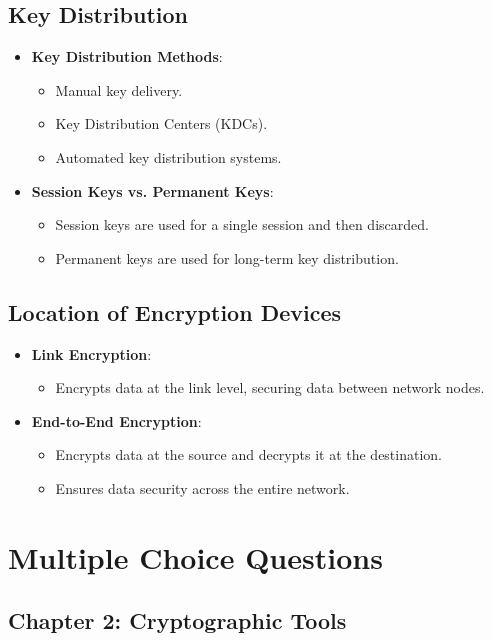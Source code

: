\documentclass[12pt]{article}
\begin{document}
\subsection{Key Distribution}
\begin{itemize}
    \item \textbf{Key Distribution Methods}:
    \begin{itemize}
        \item Manual key delivery.
        \item Key Distribution Centers (KDCs).
        \item Automated key distribution systems.
    \end{itemize}
    \item \textbf{Session Keys vs. Permanent Keys}:
    \begin{itemize}
        \item Session keys are used for a single session and then discarded.
        \item Permanent keys are used for long-term key distribution.
    \end{itemize}
\end{itemize}

\subsection{Location of Encryption Devices}
\begin{itemize}
    \item \textbf{Link Encryption}:
    \begin{itemize}
        \item Encrypts data at the link level, securing data between network nodes.
    \end{itemize}
    \item \textbf{End-to-End Encryption}:
    \begin{itemize}
        \item Encrypts data at the source and decrypts it at the destination.
        \item Ensures data security across the entire network.
    \end{itemize}
\end{itemize}
\newpage
\section*{Multiple Choice Questions}

\subsection*{Chapter 2: Cryptographic Tools}
\end{document}
